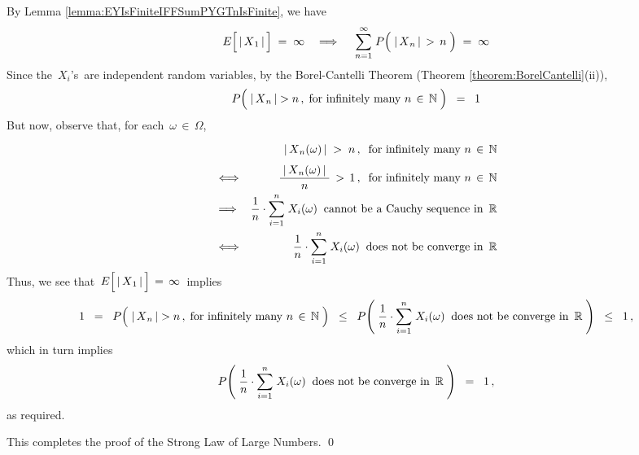 \begin{enumerate}
By Lemma \ref{lemma:EYIsFiniteIFFSumPYGTnIsFinite}, we have
\begin{equation*}
E\!\left[\,\vert\,\overset{{\color{white}.}}{X}_{1}\,\vert\,\right] \; = \; \infty
\quad\Longrightarrow\quad\;
	\overset{\infty}{\underset{n=1}{\sum}}\;P\!\left(\;\vert\,\overset{{\color{white}.}}{X}_{n}\,\vert \,>\, n\;\right) \; = \; \infty
\end{equation*}
Since the \,$X_{i}$'s\, are independent random variables,
by the Borel-Cantelli Theorem (Theorem \ref{theorem:BorelCantelli}(ii)),
\begin{equation*}
P\!\left(\;\vert\,\overset{{\color{white}.}}{X}_{n}\,\vert > n\,,\;\textnormal{for infinitely many $n\,\in\,\N$}\;\right) \;\; = \;\; 1
\end{equation*}
But now, observe that, for each \,$\omega \,\in\, \Omega$,
\begin{eqnarray*}
&&
	{\color{white}.}\vert\,\overset{{\color{white}.}}{X}_{n}(\omega)\,\vert \;>\; n\,,
	\;\;\textnormal{for infinitely many $n\,\in\,\N$}
\\
& \Longleftrightarrow &
	\dfrac{{\color{white}.}\vert\,\overset{{\color{white}.}}{X}_{n}(\omega)\,\vert{\color{white}.}}{n} \,>\, 1\,,
	\;\;\textnormal{for infinitely many $n\,\in\,\N$}
\\
& \Longrightarrow &
	\dfrac{1}{n}\cdot\overset{n}{\underset{i=1}{\sum}}\;X_{i}(\omega)
	\;\;\textnormal{cannot be a Cauchy sequence in \,$\Re$}
\\
& \Longleftrightarrow &
	\dfrac{1}{n}\cdot\overset{n}{\underset{i=1}{\sum}}\;X_{i}(\omega)
	\;\;\textnormal{does not be converge in \,$\Re$}
\end{eqnarray*}
Thus, we see that
\,$E\!\left[\,\vert\,\overset{{\color{white}.}}{X}_{1}\,\vert\,\right] \,= \, \infty$\,
implies
\begin{equation*}
1
\;\; = \;\;
	P\!\left(\;\vert\,\overset{{\color{white}.}}{X}_{n}\,\vert > n\,,\;\textnormal{for infinitely many $n\,\in\,\N$}\;\right)
\;\; \leq \;\;
	P\!\left(\;
		\dfrac{1}{n}\cdot\overset{n}{\underset{i=1}{\sum}}\;X_{i}(\omega)
		\;\;\textnormal{does not be converge in \,$\Re$}
		\;\right)
\;\; \leq \;\;
	1\,,
\end{equation*}
which in turn implies
\begin{equation*}
P\!\left(\;
	\dfrac{1}{n}\cdot\overset{n}{\underset{i=1}{\sum}}\;X_{i}(\omega)
	\;\;\textnormal{does not be converge in \,$\Re$}
	\;\right)
\;\; = \;\;
	1\,,
\end{equation*}
as required.
\end{enumerate}
This completes the proof of the Strong Law of Large Numbers.
\qed


\renewcommand{\theenumi}{\roman{enumi}}
\renewcommand{\labelenumi}{\textnormal{(\theenumi)}$\;\;$}

